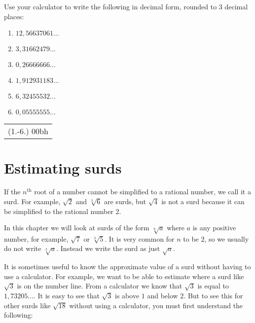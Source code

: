 \begin{exercises}{}
{Use your calculator to write the following in decimal form, rounded to $3$ decimal places:
\begin{enumerate}[itemsep=3pt, label=\textbf{\arabic*}. ]
\item $12,56637061\ldots$ %
\item $3,31662479\ldots$ %
\item $0,26666666\ldots$ %
\item $1,912931183\ldots$ %
\item $6,32455532\ldots$ %
\item $0,05555555\ldots$ %
\end{enumerate}
\practiceinfo 
\par 
 \par \begin{tabular}[h]{c}
 (1.-6.) 00bh\end{tabular}
}

\end{exercises}


\section{Estimating surds}
\setcounter{figure}{1}
\setcounter{subfigure}{1}
If the ${n}^{\mathrm{th}}$ root of a number cannot be simplified to a rational number, we call it a surd. For example, $\sqrt{2}$ and $\sqrt[3]{6}$ are surds, but $\sqrt{4}$ is not a surd because it can be simplified to the rational number $2$.\par 
In this chapter we will look at surds of the form $\sqrt[n]{a}$ where $a$ is any positive number, for example, $\sqrt{7}$ or $\sqrt[3]{5}$. It is very common for $n$ to be $2$, so we usually do not write $\sqrt[2]{a}$. Instead we write the surd as just $\sqrt{a}$.\par 
It is sometimes useful to know the approximate value of a surd without having to use a calculator. For example, we want to be able to estimate where a surd like $\sqrt{3}$ is on the number line. From a calculator we know that $\sqrt{3}$ is equal to $1,73205\ldots$. It is easy to see that $\sqrt{3}$ is above $1$ and below $2$. But to see this for other surds like $\sqrt{18}$ without using a calculator, you must first understand the following:\par 



